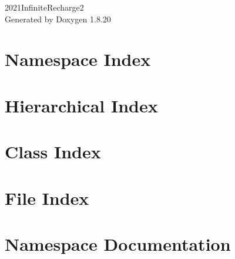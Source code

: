 \let\mypdfximage\pdfximage\def\pdfximage{\immediate\mypdfximage}\documentclass[twoside]{book}
\newcommand{\+}{\discretionary{\mbox{\scriptsize$\hookleftarrow$}}{}{}}
\newcommand{\clearemptydoublepage}{%
  \newpage{\pagestyle{empty}\cleardoublepage}%
}
\begin{document}
\hypersetup{pageanchor=false,
             bookmarksnumbered=true,
             pdfencoding=unicode
            }
\begin{titlepage}
\vspace*{7cm}
\begin{center}%
{\Large 2021Infinite\+Recharge2 }\\
\vspace*{1cm}
{\large Generated by Doxygen 1.8.20}\\
\end{center}
\end{titlepage}
\clearemptydoublepage
{}
\tableofcontents
\clearemptydoublepage
{}
\hypersetup{pageanchor=true}

\chapter{Namespace Index}

\chapter{Hierarchical Index}

\chapter{Class Index}

\chapter{File Index}

\chapter{Namespace Documentation}






\end{document}
